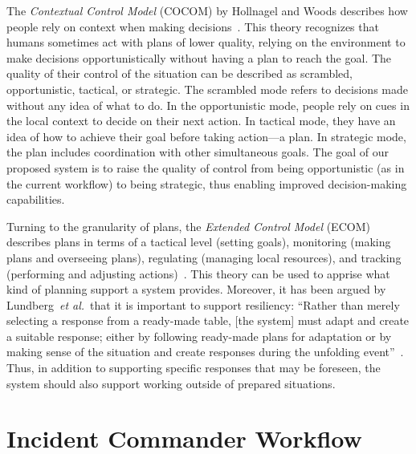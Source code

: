 \documentclass{egpubl}
\def\etal{\textit{et al.}}
\begin{document}
The \emph{Contextual Control Model} (COCOM) by Hollnagel and Woods describes how people rely on context when making decisions~\cite{hollnagel2005joint}. This theory recognizes that humans sometimes act with plans of lower quality, relying on the environment to make decisions opportunistically without having a  plan to reach the goal. The quality of their control of the situation can be described as scrambled, opportunistic, tactical, or strategic. The scrambled mode refers to decisions made without any idea of what to do. In the opportunistic mode, people rely on cues in the local context to decide on their next action. In tactical mode, they have an idea of how to achieve their goal before taking action---a plan. In strategic mode, the plan includes coordination with other simultaneous goals. The goal of our proposed system is to raise the quality of control from being opportunistic (as in the current workflow) to being strategic, thus enabling improved decision-making capabilities.

Turning to the granularity of plans, the \emph{Extended Control Model} (ECOM) describes plans in terms of a tactical level (setting goals), monitoring (making plans and overseeing plans), regulating (managing local resources), and tracking (performing and adjusting actions)~\cite{hollnagel2005joint}. This theory can be used to apprise what kind of planning support a system provides.  Moreover, it has been argued by Lundberg~\etal\ that it is important to support resiliency: ``Rather than merely selecting a response from a ready-made table, [the system] must adapt and create a suitable response; either by following ready-made plans for adaptation or by making sense of the situation and create responses during the unfolding event''~\cite{Lundberg2012}. Thus, in addition to supporting specific responses that may be foreseen, the system should also support working outside of prepared situations.


\section{Incident Commander Workflow} \label{sec:workflow}
\end{document}
